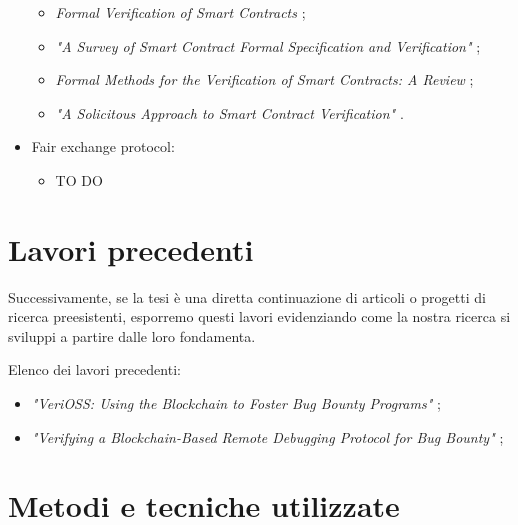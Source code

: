 \begin{itemize}
\begin{itemize}
\item \textit{Formal Verification of Smart Contracts} \cite{ethereum2024scfv};

\item \textit{"A Survey of Smart Contract Formal Specification and Verification"} \cite{tolmach2021scfsvsurvey};

\item \textit{Formal Methods for the Verification of Smart Contracts: A Review} \cite{krichen2022scfmvreview};

\item \textit{"A Solicitous Approach to Smart Contract Verification"} \cite{otoni2023verification}.

\end{itemize}

\item Fair exchange protocol:
\begin{itemize}
\item TO DO
\end{itemize}

\end{itemize}


\section{Lavori precedenti}

Successivamente, se la tesi è una diretta continuazione di articoli o progetti di ricerca preesistenti, esporremo questi lavori evidenziando come la nostra ricerca si sviluppi a partire dalle loro fondamenta.

\medskip

Elenco dei lavori precedenti:

\begin{itemize}

\item \textit{"VeriOSS: Using the Blockchain to Foster Bug Bounty Programs"} \cite{canidio2021verioss};

\item \textit{"Verifying a Blockchain-Based Remote Debugging Protocol for Bug Bounty"} \cite{degano2021verioss};

\end{itemize}


\section{Metodi e tecniche utilizzate}

